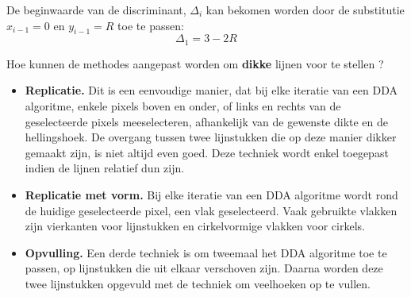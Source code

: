 \documentclass{report}
\begin{document}
\begin{enumerate}
{\begin{itemize}
				De beginwaarde van de discriminant, $\Delta_i$ kan bekomen worden door de substitutie $x_{i - 1} = 0$ en $y_{i - 1} = R$ toe te passen:
				$$\Delta_1 = 3 - 2R$$
				
			\end{itemize}

		}

		
		\vraag
		{
			Hoe kunnen de methodes aangepast worden om \textbf{dikke} lijnen voor te stellen ? 
		}
		{
			\begin{itemize}
				\item \textbf{Replicatie.} Dit is een eenvoudige manier, dat bij elke iteratie van een DDA algoritme, enkele pixels boven en onder, of links en rechts van de geselecteerde pixels meeselecteren, afhankelijk van de gewenste dikte en de hellingshoek. De overgang tussen twee lijnstukken die op deze manier dikker gemaakt zijn, is niet altijd even goed. Deze techniek wordt enkel toegepast indien de lijnen relatief dun zijn.
				\item \textbf{Replicatie met vorm.} Bij elke iteratie van een DDA algoritme wordt rond de huidige geselecteerde pixel, een vlak geselecteerd. Vaak gebruikte vlakken zijn vierkanten voor lijnstukken en cirkelvormige vlakken voor cirkels.
				
				\item \textbf{Opvulling.} Een derde techniek is om tweemaal het DDA algoritme toe te passen, op lijnstukken die uit elkaar verschoven zijn. Daarna worden deze twee lijnstukken opgevuld met de techniek om veelhoeken op te vullen.
			\end{itemize}
		}
	\end{enumerate}
\end{document}
